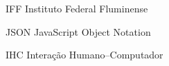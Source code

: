 \begin{siglas}
  \item[IFF] Instituto Federal Fluminense
  \item[JSON] JavaScript Object Notation
  \item[IHC] Interação Humano–Computador
\end{siglas}